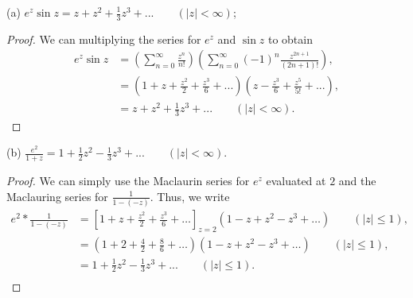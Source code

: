 \documentclass{article}
\begin{document}
(a) $e^z \sin z = z + z^2 + \frac{1}{3}z^3 + ... \qquad (|z| < \infty)$;
\begin{proof}
    We can multiplying the series for $e^z$ and $\sin z$ to obtain
    \begin{align*}
        e^z \sin z & = \left(\sum_{n=0}^\infty \frac{z^n}{n!}\right)
        \left(\sum_{n=0}^\infty (-1)^n \frac{z^{2n+1}}{(2n+1)!}\right),        \\
                   & = \left(1+ z + \frac{z^2}{2} + \frac{z^3}{6} + ...\right)
        \left(z - \frac{z^3}{6} + \frac{z^5}{5!} + ...\right),                 \\
                   & = z + z^2 + \frac{1}{3}z^3 + ... \qquad (|z| < \infty).
    \end{align*}
\end{proof}

(b) $\frac{e^2}{1 + z} = 1 + \frac{1}{2}z^2 - \frac{1}{3}z^3 + ... \qquad (|z| < \infty)$.
\begin{proof}
    We can simply use the Maclaurin series for $e^z$ evaluated at $2$ and the
    Maclauring series for $\frac{1}{1 - (-z)}$. Thus, we write
    \begin{align*}
        e^2 * \frac{1}{1-(-z)} & = [1 + z + \frac{z^2}{2} + \frac{z^3}{6} + \dots]_{z=2}
        (1 - z + z^2 - z^3 + \dots) \qquad (|z| \leq 1),                                          \\
                               & = (1 + 2 + \frac{4}{2} + \frac{8}{6} + \dots)
        (1 - z + z^2 - z^3 + \dots) \qquad (|z| \leq 1),                                          \\
                               & = 1 + \frac{1}{2}z^2 - \frac{1}{3}z^3 + ... \qquad (|z| \leq 1). \\
    \end{align*}
\end{proof}
\end{document}
